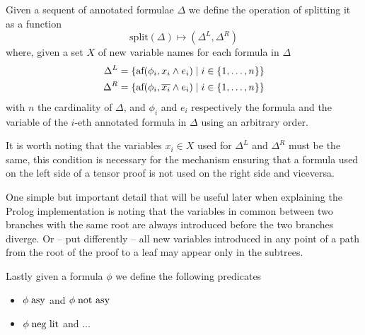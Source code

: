 \documentclass[a4paper, 12pt, tesi, english]{report}
\begin{document}
\begin{define}
	Given a sequent of annotated formulae $\Delta$ we define the operation of splitting it as a function
	$$ \text{split}(\Delta) \mapsto (\Delta^L, \Delta^R) $$
	where, given a set $X$ of new variable names for each formula in $\Delta$
	\begin{align*}
		\Delta^L &= \{ \text{af}(\phi_i, x_i \wedge e_i) \mid i \in \{1, \dots, n\}\} \\
		\Delta^R &= \{ \text{af}(\phi_i, \overline{x_i} \wedge e_i) \mid i \in \{1, \dots, n\}\} \\
	\end{align*}
	with $n$ the cardinality of $\Delta$, and $\phi_i$ and $e_i$ respectively the formula and the variable of the $i$-eth annotated formula in $\Delta$ using an arbitrary order.

	It is worth noting that the variables $x_i \in X$ used for $\Delta^L$ and $\Delta^R$ must be the same, this condition is necessary for the mechanism ensuring that a formula used on the left side of a tensor proof is not used on the right side and viceversa.
\end{define}

One simple but important detail that will be useful later when explaining the Prolog implementation is noting that the variables in common between two branches with the same root are always introduced before the two branches diverge.
Or -- put differently -- all new variables introduced in any point of a path from the root of the proof to a leaf may appear only in the subtrees.	%

\begin{define}
	Lastly given a formula $\phi$ we define the following predicates
	\begin{itemize}
		\item $\phi \; \text{asy}$ and $\phi \; \text{not asy}$
		\item $\phi \; \text{neg lit}$ and ...
	\end{itemize}
\end{define}
\end{document}

